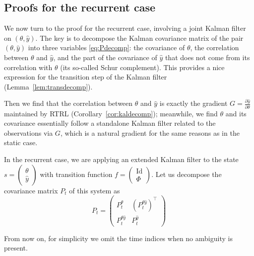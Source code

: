 \documentclass[11pt,a4paper]{article}
\DeclareMathOperator{\Id}{Id}
\newcommand{\1}{\mathbbm{1}}
\theoremstyle{yannthm}
\theoremstyle{yannthm2}
\newcommand{\transp}[1]{#1^{\!\top}\!}
\newcommand{\Ptheta}{P^\theta}
\newcommand{\Py}{P^{\hat y}}
\newcommand{\Pthetay}{P^{\theta\hat y}}
\newcommand{\transf}{\Phi}
\numberwithin{equation}{section}
\begin{document}
\subsection{Proofs for the recurrent case}

We now turn to the proof for the recurrent case, involving a joint Kalman
filter on $(\theta,\hat y)$. The key is to decompose the Kalman
covariance matrix of the pair $(\theta,\hat y)$ into three variables
\eqref{eq:Pdecomp}: the covariance of $\theta$, the correlation between
$\theta$ and $\hat y$, and the part of the covariance of $\hat y$ that
does not come from its correlation with $\theta$ (its so-called Schur
complement). This provides a nice expression for the transition step of
the Kalman filter (Lemma~\ref{lem:transdecomp}).

Then we find that the correlation between $\theta$ and $\hat y$ is
exactly the gradient $G=\frac{\partial\hat y}{\partial \theta}$
maintained by RTRL (Corollary~\ref{cor:kaldecomp}); meanwhile, we find $\theta$
and its covariance essentially follow a standalone Kalman filter related
to the observations via $G$, which is a natural gradient for the same
reasons as in the static case.

In the recurrent case,
we are applying an extended Kalman filter to the state $s=\begin{pmatrix}\theta\\\hat
y\end{pmatrix}$ with
transition function $f=\begin{pmatrix}\Id \\ \transf\end{pmatrix}$.
Let us decompose the covariance matrix $P_t$ of this system as
\begin{equation}
P_t=
\begin{pmatrix}
\Ptheta_t & \transp{(\Pthetay_t)}
\\ \Pthetay_t & \Py_t
\end{pmatrix}
\end{equation}

From now on, for simplicity we omit the time indices when no ambiguity is
present.
\end{document}

